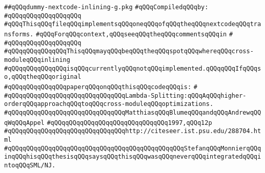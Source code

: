 \label{src/lib/compiler/back/top/closures/dummy-nextcode-inlining-g.pkg}
\verb|##qQQqdummy-nextcode-inlining-g.pkg|\newline
\newline
\verb|#qQQqCompiledqQQqby:|\newline
\verb|#qQQqqQQqqQQqqQQqqQQq|\newline
\newline
\newline
\newline
\verb|#qQQqThisqQQqfileqQQqimplementsqQQqoneqQQqofqQQqtheqQQqnextcodeqQQqtransforms.|\newline
\verb|#qQQqForqQQqcontext,qQQqseeqQQqtheqQQqcommentsqQQqin|\newline
\verb|#|\newline
\verb|#qQQqqQQqqQQqqQQqqQQq|\newline
\newline
\newline
\newline
\verb|#qQQqqQQqqQQqqQQqThisqQQqmayqQQqbeqQQqtheqQQqspotqQQqwhereqQQqcross-moduleqQQqinlining|\newline
\verb|#qQQqqQQqqQQqqQQqisqQQqcurrentlyqQQqnotqQQqimplemented.qQQqqQQqIfqQQqso,qQQqtheqQQqoriginal|\newline
\verb|#qQQqqQQqqQQqqQQqpaperqQQqonqQQqthisqQQqcodeqQQqis:|\newline
\verb|#|\newline
\verb|#qQQqqQQqqQQqqQQqqQQqqQQqqQQqqQQqLambda-Splitting:qQQqAqQQqhigher-orderqQQqapproachqQQqtoqQQqcross-moduleqQQqoptimizations.|\newline
\verb|#qQQqqQQqqQQqqQQqqQQqqQQqqQQqqQQqMatthiasqQQqBlumeqQQqandqQQqAndrewqQQqWqQQqAppel|\newline
\verb|#qQQqqQQqqQQqqQQqqQQqqQQqqQQqqQQq1997,qQQq12p|\newline
\verb|#qQQqqQQqqQQqqQQqqQQqqQQqqQQqqQQqhttp://citeseer.ist.psu.edu/288704.html|\newline
\verb|#qQQqqQQqqQQqqQQqqQQqqQQqqQQqqQQqqQQqqQQqqQQqqQQqStefanqQQqMonnierqQQqinqQQqhisqQQqthesisqQQqsaysqQQqthisqQQqwasqQQqneverqQQqintegratedqQQqintoqQQqSML/NJ.|\newline
\newline
\newline
\newline
\newline
